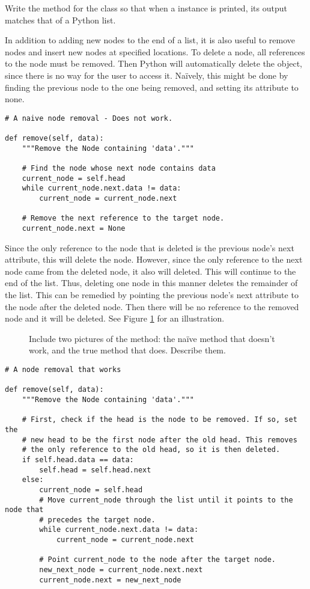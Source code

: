 \begin{problem}
Write the  method for the  class so that when a  instance is printed, its output matches that of a Python list.
\end{problem}

In addition to adding new nodes to the end of a list, it is also useful to remove nodes and insert new nodes at specified locations.
To delete a node, all references to the node must be removed.
Then Python will automatically delete the object, since there is no way for the user to access it.
Na{\"i}vely, this might be done by finding the previous node to the one being removed, and setting its  attribute to none.

\begin{lstlisting}
# A naive node removal - Does not work.

def remove(self, data):
	"""Remove the Node containing 'data'."""

	# Find the node whose next node contains data
	current_node = self.head
	while current_node.next.data != data:
		current_node = current_node.next

	# Remove the next reference to the target node.
	current_node.next = None
\end{lstlisting}

Since the only reference to the node that is deleted is the previous node's next attribute, this will delete the node.
However, since the only reference to the next node came from the deleted node, it also will deleted.
This will continue to the end of the list.
Thus, deleting one node in this manner deletes the remainder of the list.
This can be remedied by pointing the previous node's next attribute to the node after the deleted node.
Then there will be no reference to the removed node and it will be deleted. 
See Figure \ref{fig:remove} for an illustration.

\begin{figure}
\centering
\caption{Include two pictures of the  method: the na{\"i}ve method that doesn't work, and the true method that does. Describe them.}
\label{fig:remove}
\end{figure}


\begin{lstlisting}
# A node removal that works

def remove(self, data):
	"""Remove the Node containing 'data'."""

	# First, check if the head is the node to be removed. If so, set the
	# new head to be the first node after the old head. This removes
	# the only reference to the old head, so it is then deleted.
	if self.head.data == data:
		self.head = self.head.next
	else:
		current_node = self.head
		# Move current_node through the list until it points to the node that
		# precedes the target node.
		while current_node.next.data != data:
			current_node = current_node.next
	
		# Point current_node to the node after the target node.
		new_next_node = current_node.next.next
		current_node.next = new_next_node
\end{lstlisting}

